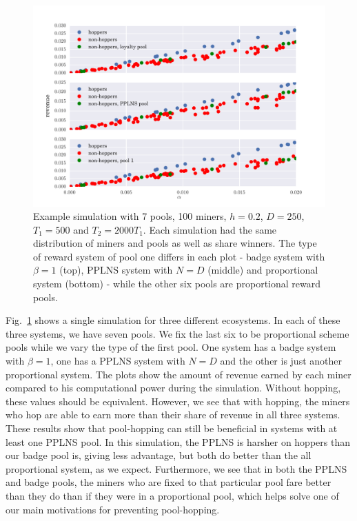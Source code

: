 \documentclass{article}
\theoremstyle{plain}
\theoremstyle{definition}
\begin{document}
\begin{figure}[H]
\includegraphics[width = \textwidth]{figures/compare_revs2.pdf}
\caption{Example simulation with 7 pools, 100 miners, $h = 0.2$, $D = 250$, $T_1 = 500$ and $T_2 = 2000T_1$. Each simulation had the same distribution of miners and pools as well as share winners. The type of reward system of pool one differs in each plot - badge system with $\beta = 1$ (top), PPLNS system with $N=D$ (middle) and proportional system (bottom) - while the other six pools are proportional reward pools.}
\label{fig:compare_revs}
\end{figure}

Fig.~\ref{fig:compare_revs} shows a single simulation for three different ecosystems. In each of these three systems, we have seven pools. We fix the last six to be proportional scheme pools while we vary the type of the first pool. One system has a badge system with $\beta = 1$, one has a PPLNS system with $N=D$ and the other is just another proportional system. The plots show the amount of revenue earned by each miner compared to his computational power during the simulation. Without hopping, these values should be equivalent. However, we see that with hopping, the miners who hop are able to earn more than their share of revenue in all three systems. These results show that pool-hopping can still be beneficial in systems with at least one PPLNS pool. In this simulation, the PPLNS is harsher on hoppers than our badge pool is, giving less advantage, but both do better than the all proportional system, as we expect. Furthermore, we see that in both the PPLNS and badge pools, the miners who are fixed to that particular pool fare better than they do than if they were in a proportional pool, which helps solve one of our main motivations for preventing pool-hopping. 
\end{document}
